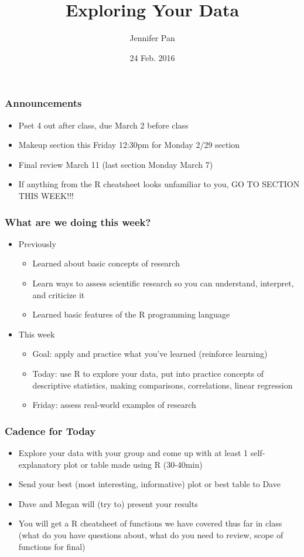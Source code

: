 \documentclass{beamer}
\title[COMM 106/206]{Exploring Your Data}
\subtitle{\black{Communication Research Methods}} %
\author[Jennifer Pan]{Jennifer Pan}
\institute[Stanford]{Assistant Professor\\
  Department of Communication\\
  Stanford University
  \mbox{ }\\
  \mbox{ }\\
  \mbox{ }\\
  \mbox{ }\\
  \mbox{ }\\
  \mbox{ }\\
  \mbox{ }\\
  \mbox{ }\\
  \mbox{ }\\
  {February 24, 2016}}
\date{}
\begin{document}
\frame{\titlepage}
\date{24 Feb. 2016}

\begin{frame}
 \frametitle<+->{Announcements}
 \begin{itemize}[<+->]
   \item Pset 4 out after class, due March 2 before class
   \item Makeup section this Friday 12:30pm for Monday 2/29 section
   \item Final review March 11 (last section Monday March 7)
   \item If anything from the R cheatsheet looks unfamiliar to you, \alert{GO TO SECTION THIS WEEK!!!}
 \end{itemize}
\end{frame}

\begin{frame}
 \frametitle<+->{What are we doing this week?}
 \begin{itemize}[<+->]
   \item Previously
     \begin{itemize}
       \item Learned about basic concepts of research
       \item Learn ways to assess scientific research so you can understand, interpret, and criticize it
       \item Learned basic features of the R programming language
     \end{itemize}
   \item This week
     \begin{itemize}
       \item Goal: apply and practice what you've learned (reinforce learning)
       \item Today: use R to explore your data, put into practice concepts of descriptive statistics, making comparisons, correlations, linear regression
       \item Friday: assess real-world examples of research
     \end{itemize}
 \end{itemize}
\end{frame}

\begin{frame}
 \frametitle<+->{Cadence for Today}
 \begin{itemize}[<+->]
   \item Explore your data with your group and come up with at least 1 self-explanatory plot or table made using R (30-40min)
   \item Send your best (most interesting, informative) plot or best table to Dave
   \item Dave and Megan will (try to) present your results
   \item You will get a R cheatsheet of functions we have covered thus far in class (what do you have questions about, what do you need to review, scope of functions for final)
 \end{itemize}
\end{frame}
\end{document}
